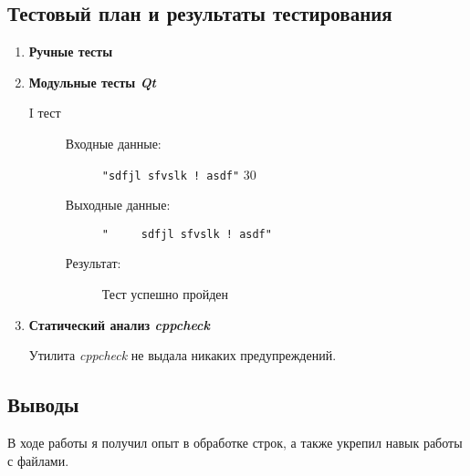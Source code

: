 \documentclass[12pt,a4paper]{report}
\begin{document}
\subsection{Тестовый план и результаты тестирования}
\hspace{\parindent}
\begin{enumerate}
\item \textbf{Ручные тесты}
\begin{flushleft}
\end{flushleft}
\item \textbf{Модульные тесты \textit{Qt}}

\begin{description}
\item[I тест]
\hspace{\parindent}
\begin{flushleft}
\begin{description}
\item[Входные данные:] \verb-"sdfjl sfvslk ! asdf"- 30


\item[Выходные данные:] \verb-"     sdfjl sfvslk ! asdf"-

\item[Результат:] Тест успешно пройден
\end{description}
\end{flushleft}
\end{description}

\item \textbf{Статический анализ \textit{cppcheck}}

Утилита \textit{cppcheck} не выдала никаких предупреждений.
\end{enumerate}
\subsection{Выводы}
\hspace{\parindent}
В ходе работы я получил опыт в обработке строк, а также укрепил навык работы с файлами.
\end{document}
